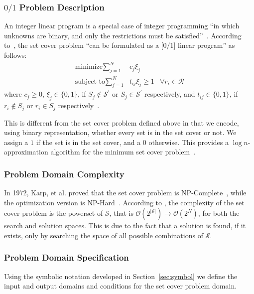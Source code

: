 \documentclass[conference]{IEEEtran}
\newcommand{\bigoh}[1]{\ensuremath{\mathcal{O}(#1)}}		%
\begin{document}
\subsubsection{$0/1$ Problem Description}
An integer linear program is a special case of integer programming ``in which
unknowns are binary, and only the restrictions must be
satisfied''~\cite{wiki:IP}. According to~\cite{christofides1975}, the set cover
problem ``can be formulated as a [$0/1$] linear program'' as follows:
\begin{align*}
  \text{minimize} \sum\limits_{j=1}^N &c_j \xi_j\\
  \text{subject to} \sum\limits_{j=1}^N &t_{ij} \xi_j \geq 1 &\forall
  r_i \in \mathcal{R}
\end{align*}
where ${c_j \geq 0}$, ${\xi_j \in \lbrace 0,1 \rbrace}$, if ${S_j \notin
\mathcal{S}^\prime}$ or ${S_j \in \mathcal{S}^\prime}$ respectively, and ${t_{ij}
\in \lbrace 0,1 \rbrace}$, if ${r_i \notin S_j}$ or ${r_i \in S_j}$
respectively~\cite[p. 39-40]{christofides1975}.

This is different from the set cover problem defined above in that we encode,
using binary representation, whether every set is in the set cover or not.
We assign a $1$ if the set is in the set cover, and a $0$ otherwise. This
provides a $\log{n}$-approximation algorithm for the minimum
set cover problem~\cite{wiki:SCP}.

\subsubsection{Problem Domain Complexity} \label{sec:pdComplex}

In 1972, Karp, et al. proved that the set cover problem is
NP-Complete~\cite{karp1972}, while the optimization version is
NP-Hard~\cite{wiki:SCP}. According to \cite{wiki:SCP, lamontSCP}, the
complexity of the set cover problem is the powerset of $\mathcal{S}$, that is
${\bigoh{2^{|\mathcal{S}|}} \rightarrow \bigoh{2^N}}$, for both the search and
solution spaces. This is due to the fact that a solution is found, if it
exists, only by searching the space of all possible combinations of
$\mathcal{S}$.

\subsubsection{Problem Domain Specification}
Using the symbolic notation developed in Section~\ref{sec:symbol} we define the
input and output domains and conditions for the set cover problem domain.
\end{document}
